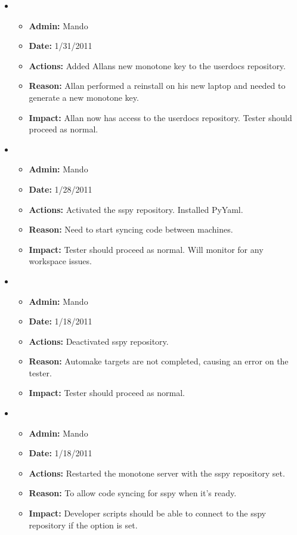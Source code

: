 \documentclass[12pt]{article}
\begin{document}
\begin{itemize}


\item
\begin{itemize}
\item[] {\bf Admin:} Mando
\item[] {\bf Date:} 1/31/2011 
\item[] {\bf Actions:}  Added Allans new monotone key to the userdocs repository.
\item[] {\bf Reason:} Allan performed a reinstall on his new laptop and needed to generate a new monotone key.
\item[] {\bf Impact:}  Allan now has access to the userdocs repository. Tester should proceed as normal. 
\end{itemize}

\item
\begin{itemize}
\item[] {\bf Admin:} Mando
\item[] {\bf Date:} 1/28/2011 
\item[] {\bf Actions:}  Activated the sspy repository. Installed PyYaml.
\item[] {\bf Reason:} Need to start syncing code between machines. 
\item[] {\bf Impact:}  Tester should proceed as normal. Will monitor for any workspace issues.
\end{itemize}


\item
\begin{itemize}
\item[] {\bf Admin:} Mando
\item[] {\bf Date:} 1/18/2011 
\item[] {\bf Actions:}  Deactivated sspy repository.
\item[] {\bf Reason:} Automake targets are not completed, causing an error on the tester.
\item[] {\bf Impact:}  Tester should proceed as normal.
\end{itemize}

\item
\begin{itemize}
\item[] {\bf Admin:} Mando
\item[] {\bf Date:} 1/18/2011 
\item[] {\bf Actions:} Restarted the monotone server with the sspy repository set.
\item[] {\bf Reason:} To allow code syncing for sspy when it's ready.
\item[] {\bf Impact:}  Developer scripts should be able to connect to the sspy repository if the option is set.
\end{itemize}


\end{itemize}
\end{document}
